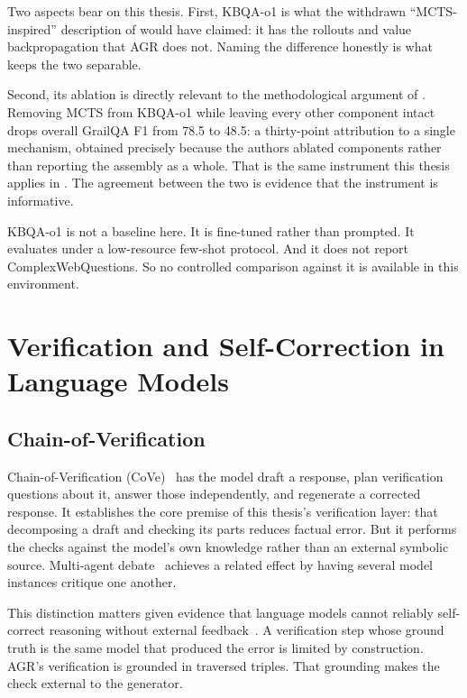 Two aspects bear on this thesis. First, KBQA-o1 is what the withdrawn
``MCTS-inspired'' description of  would have
claimed: it has the rollouts and value backpropagation that AGR does not.
Naming the difference honestly is what keeps the two separable.

Second, its ablation is directly relevant to the methodological argument of
. Removing MCTS from KBQA-o1 while leaving every other
component intact drops overall GrailQA F1 from 78.5 to 48.5: a thirty-point
attribution to a single mechanism, obtained precisely because the authors
ablated components rather than reporting the assembly as a whole. That is the
same instrument this thesis applies in . The agreement
between the two is evidence that the instrument is informative.

KBQA-o1 is not a baseline here. It is fine-tuned rather than prompted. It
evaluates under a low-resource few-shot protocol. And it does not report
ComplexWebQuestions. So no controlled comparison against it is available in
this environment.

\section{Verification and Self-Correction in Language
Models}\label{sec:verification-related}

\subsection{Chain-of-Verification}

Chain-of-Verification (CoVe)~\cite{dhuliawala2024chain} has the model draft a
response, plan verification questions about it, answer those independently, and
regenerate a corrected response. It establishes the core premise of this
thesis's verification layer: that decomposing a draft and checking its parts
reduces factual error. But it performs the checks against the model's own
knowledge rather than an external symbolic source. Multi-agent
debate~\cite{du2024improving} achieves a related effect by having several model
instances critique one another.

This distinction matters given evidence that language models cannot reliably
self-correct reasoning without external feedback~\cite{huang2024selfcorrect}. A
verification step whose ground truth is the same model that produced the error
is limited by construction. AGR's verification is grounded in traversed
triples. That grounding makes the check external to the generator.

